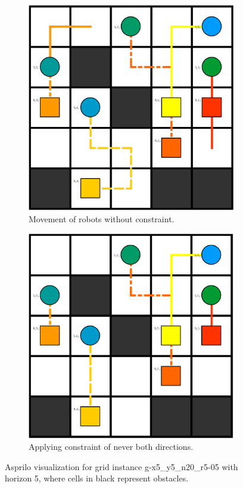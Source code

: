 \begin{figure}
    \centering
\begin{subfigure}{.45\textwidth}
    \centering
    \includegraphics[scale=0.18]{img/g-asprilo-nc.png}
    \caption{Movement of robots without constraint.}
\end{subfigure}%
\hspace{10px}
\begin{subfigure}{.45\textwidth}
    \centering
    \includegraphics[scale=0.18]{img/g-asprilo.png}
    \caption{Applying constraint of never both directions.}
\end{subfigure}
\caption{Asprilo visualization for grid instance g-x5\_y5\_n20\_r5-05 with horizon 5, where cells in black represent obstacles.}
\end{figure}

